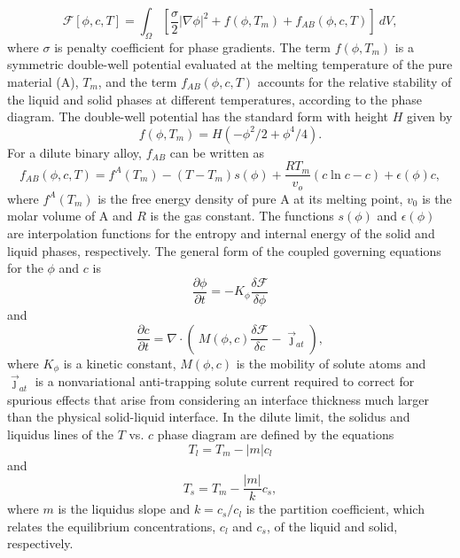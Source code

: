 \documentclass[10pt]{article}
\begin{document}
\begin{equation}
\mathcal{F}[\phi,c,T]= \int_{\Omega}  \left[\frac{\sigma}{2}|\nabla \phi|^2 +f(\phi, T_m) +  f_{AB}(\phi, c, T) \right]  ~dV,
\end{equation}
where $\sigma$ is penalty coefficient for phase gradients. The term $f(\phi, T_m)$ is a symmetric double-well potential evaluated at the melting temperature of the pure material (A), $T_m$, and  the term $f_{AB}(\phi, c, T)$ accounts for the relative stability of the liquid and solid phases at different temperatures, according to the phase diagram. The double-well potential has the standard form with height $H$ given by
\begin{equation}
f(\phi, T_m) = H(-\phi^2/2 + \phi^4/4).
\end{equation}
For a dilute binary alloy, $f_{AB}$ can be written as
\begin{equation}
f_{AB}(\phi, c, T) = f^A(T_m) - (T-T_m) s(\phi) +  \frac{R T_m}{v_o}(c\ln c -c) +\epsilon (\phi) c,
\end{equation}
where $f^A(T_m)$ is the free energy density of pure A at its melting point, $v_0$ is the molar volume of A and $R$ is the gas constant. The functions $s(\phi)$ and $\epsilon(\phi)$ are interpolation functions for the entropy and internal energy of the solid and liquid phases, respectively. The general form of the coupled governing equations for the $\phi$ and $c$ is
\begin{equation}
\frac{\partial \phi}{\partial t} = -K_\phi \frac{\delta \mathcal{F}}{\delta \phi}
\end{equation}
and
\begin{equation}
\frac{\partial c}{\partial t} = \nabla \cdot \left(\  M(\phi,c) \frac{\delta \mathcal{F}}{\delta c}  - \vec{\jmath}_{at} \right), 
\end{equation}
where $K_\phi$ is a kinetic constant, $M(\phi,c)$ is the mobility of solute atoms and $\vec{\jmath}_{at}$ is a nonvariational anti-trapping solute current required to correct for spurious effects that arise from considering an interface thickness much larger than the physical solid-liquid interface. In the dilute limit, the solidus and liquidus lines of the $T$ vs. $c$ phase diagram are defined by the equations
\begin{equation}
T_l=T_m-|m|c_l
\end{equation}
and
\begin{equation}
T_s=T_m-\frac{|m|}{k}c_s,
\end{equation}
where $m$ is the liquidus slope and $k=c_s/c_l$ is the partition coefficient, which relates the equilibrium concentrations, $c_l$ and $c_s$, of the liquid and solid, respectively.\\
\end{document}
